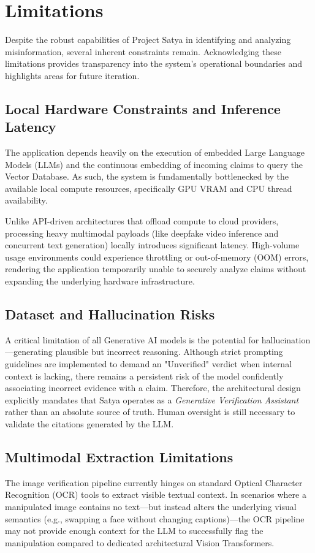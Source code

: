 \chapter{Limitations}

Despite the robust capabilities of Project Satya in identifying and analyzing misinformation, several inherent constraints remain. Acknowledging these limitations provides transparency into the system's operational boundaries and highlights areas for future iteration.

\section{Local Hardware Constraints and Inference Latency}
The application depends heavily on the execution of embedded Large Language Models (LLMs) and the continuous embedding of incoming claims to query the Vector Database. As such, the system is fundamentally bottlenecked by the available local compute resources, specifically GPU VRAM and CPU thread availability. 

Unlike API-driven architectures that offload compute to cloud providers, processing heavy multimodal payloads (like deepfake video inference and concurrent text generation) locally introduces significant latency. High-volume usage environments could experience throttling or out-of-memory (OOM) errors, rendering the application temporarily unable to securely analyze claims without expanding the underlying hardware infrastructure.

\section{Dataset and Hallucination Risks}
A critical limitation of all Generative AI models is the potential for hallucination—generating plausible but incorrect reasoning. Although strict prompting guidelines are implemented to demand an "Unverified" verdict when internal context is lacking, there remains a persistent risk of the model confidently associating incorrect evidence with a claim. Therefore, the architectural design explicitly mandates that Satya operates as a \textit{Generative Verification Assistant} rather than an absolute source of truth. Human oversight is still necessary to validate the citations generated by the LLM.

\section{Multimodal Extraction Limitations}
The image verification pipeline currently hinges on standard Optical Character Recognition (OCR) tools to extract visible textual context. In scenarios where a manipulated image contains no text—but instead alters the underlying visual semantics (e.g., swapping a face without changing captions)—the OCR pipeline may not provide enough context for the LLM to successfully flag the manipulation compared to dedicated architectural Vision Transformers.
